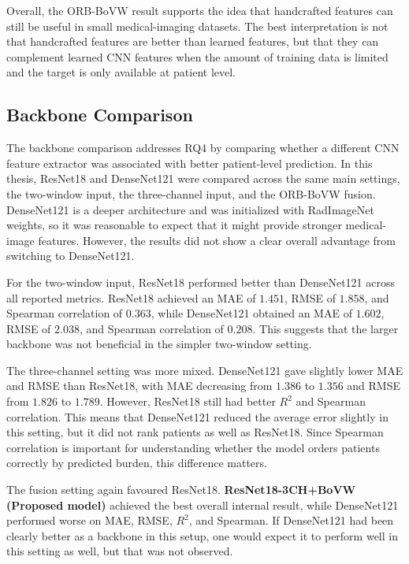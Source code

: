 Overall, the ORB-BoVW result supports the idea that handcrafted features can still be useful in small medical-imaging datasets. The best interpretation is not that handcrafted features are better than learned features, but that they can complement learned CNN features when the amount of training data is limited and the target is only available at patient level.


\subsection{Backbone Comparison}
The backbone comparison addresses RQ4 by comparing whether a different CNN feature extractor was associated with better patient-level prediction. In this thesis, ResNet18 and DenseNet121 were compared across the same main settings, the two-window input, the three-channel input, and the ORB-BoVW fusion. DenseNet121 is a deeper architecture and was initialized with RadImageNet weights, so it was reasonable to expect that it might provide stronger medical-image features. However, the results did not show a clear overall advantage from switching to DenseNet121.

For the two-window input, ResNet18 performed better than DenseNet121 across all reported metrics. ResNet18 achieved an MAE of \(1.451\), RMSE of \(1.858\), and Spearman correlation of \(0.363\), while DenseNet121 obtained an MAE of \(1.602\), RMSE of \(2.038\), and Spearman correlation of \(0.208\). This suggests that the larger backbone was not beneficial in the simpler two-window setting.

The three-channel setting was more mixed. DenseNet121 gave slightly lower MAE and RMSE than ResNet18, with MAE decreasing from \(1.386\) to \(1.356\) and RMSE from \(1.826\) to \(1.789\). However, ResNet18 still had better \(R^2\) and Spearman correlation. This means that DenseNet121 reduced the average error slightly in this setting, but it did not rank patients as well as ResNet18. Since Spearman correlation is important for understanding whether the model orders patients correctly by predicted burden, this difference matters.

The fusion setting again favoured ResNet18. \textbf{ResNet18-3CH+BoVW (Proposed model)} achieved the best overall internal result, while DenseNet121 performed worse on MAE, RMSE, \(R^2\), and Spearman. If DenseNet121 had been clearly better as a backbone in this setup, one would expect it to perform well in this setting as well, but that was not observed.

